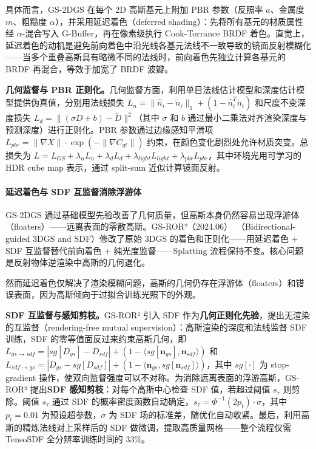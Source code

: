 具体而言，GS-2DGS 在每个 2D 高斯基元上附加 PBR 参数（反照率 $a$、金属度 $m$、粗糙度 $\alpha$），并采用延迟着色（deferred shading）：先将所有基元的材质属性经 $\alpha$-混合写入 G-Buffer，再在像素级执行 Cook-Torrance BRDF 着色。直觉上，延迟着色的动机是避免前向着色中沿光线各基元法线不一致导致的镜面反射模糊化——当多个重叠高斯具有略微不同的法线时，前向着色先独立计算各基元的 BRDF 再混合，等效于加宽了 BRDF 波瓣。

\textbf{几何监督与 PBR 正则化。}几何监督方面，利用单目法线估计模型和深度估计模型提供伪真值，分别用法线损失 $L_n = \|\hat{n}_i - \tilde{n}_i\|_1 + (1 - \hat{n}_i^T \tilde{n}_i)$ 和尺度不变深度损失 $L_d = \|(\sigma D + b) - \tilde{D}\|^2$（其中 $\sigma$ 和 $b$ 通过最小二乘法对齐渲染深度与预测深度）进行正则化。PBR 参数通过边缘感知平滑项 $L_{pbr} = \|\nabla X\| \cdot \exp(-\|\nabla C_{gt}\|)$ 约束，在颜色变化剧烈处允许材质突变。总损失为 $L = L_{GS} + \lambda_n L_n + \lambda_d L_d + \lambda_{light} L_{light} + \lambda_{pbr} L_{pbr}$，其中环境光用可学习的 HDR cube map 表示，通过 split-sum 近似计算镜面反射。

\paragraph{延迟着色与 SDF 互监督消除浮游体}

GS-2DGS 通过基础模型先验改善了几何质量，但高斯本身仍然容易出现浮游体（floaters）——远离表面的零散高斯。GS-ROR²（2024.06）~\cite{2406_18544}（Bidirectional-guided 3DGS and SDF）修改了原始 3DGS 的着色和正则化——用延迟着色 + SDF 互监督替代前向着色 + 纯光度监督——Splatting 流程保持不变。核心问题是反射物体逆渲染中高斯的几何退化。

然而延迟着色仅解决了渲染模糊问题，高斯的几何仍存在浮游体（floaters）和错误表面，因为高斯倾向于过拟合训练光照下的外观。

\textbf{SDF 互监督与感知剪枝。}GS-ROR² 引入 SDF 作为\textbf{几何正则化先验}，提出无渲染的互监督（rendering-free mutual supervision）：高斯渲染的深度和法线监督 SDF 训练，SDF 的零等值面反过来约束高斯几何，即 $L_{gs \to sdf} = |sg[D_{gs}] - D_{sdf}| + (1 - \langle sg[\mathbf{n}_{gs}], \mathbf{n}_{sdf} \rangle)$ 和 $L_{sdf \to gs} = |D_{gs} - sg[D_{sdf}]| + (1 - \langle \mathbf{n}_{gs}, sg[\mathbf{n}_{sdf}] \rangle)$，其中 $sg[\cdot]$ 为 stop-gradient 操作，使双向监督强度可以不对称。为消除远离表面的浮游高斯，GS-ROR² 提出\textbf{SDF 感知剪枝}：对每个高斯中心检查 SDF 值，若超过阈值 $s_\tau$ 则剪除。阈值 $s_\tau$ 通过 SDF 的概率密度函数自动确定，$s_\tau = \Phi^{-1}(2p_t) \cdot \sigma$，其中 $p_t = 0.01$ 为预设超参数，$\sigma$ 为 SDF 场的标准差，随优化自动收紧。最后，利用高斯的精炼法线对上采样后的 SDF 做微调，提取高质量网格——整个流程仅需 TensoSDF 全分辨率训练时间的 33\%。

